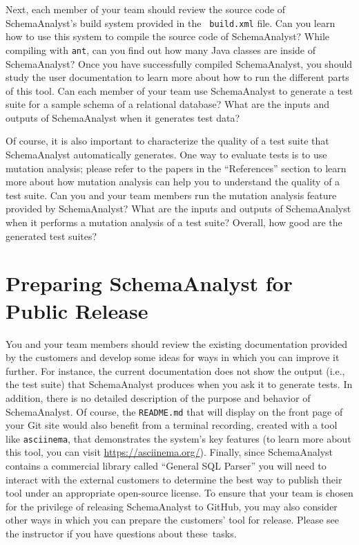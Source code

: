 Next, each member of your team should review the source code of SchemaAnalyst's build system provided in the {\tt
build.xml} file. Can you learn how to use this system to compile the source code of SchemaAnalyst? While compiling with
{\tt ant}, can you find out how many Java classes are inside of SchemaAnalyst? Once you have successfully compiled
SchemaAnalyst, you should study the user documentation to learn more about how to run the different parts of this tool.
Can each member of your team use SchemaAnalyst to generate a test suite for a sample schema of a relational database?
What are the inputs and outputs of SchemaAnalyst when it generates test data?

Of course, it is also important to characterize the quality of a test suite that SchemaAnalyst automatically generates.
One way to evaluate tests is to use mutation analysis; please refer to the papers in the ``References'' section to learn
more about how mutation analysis can help you to understand the quality of a test suite. Can you and your team members
run the mutation analysis feature provided by SchemaAnalyst? What are the inputs and outputs of SchemaAnalyst when it
performs a mutation analysis of a test suite? Overall, how good are the generated test suites?

\vspace*{-.05in}
\section*{Preparing SchemaAnalyst for Public Release}

You and your team members should review the existing documentation provided by the customers and develop some ideas for
ways in which you can improve it further. For instance, the current documentation does not show the output (i.e., the
test suite) that SchemaAnalyst produces when you ask it to generate tests. In addition, there is no detailed description
of the purpose and behavior of SchemaAnalyst. Of course, the {\tt README.md} that will display on the front page of your
Git site would also benefit from a terminal recording, created with a tool like {\tt asciinema}, that demonstrates the
system's key features (to learn more about this tool, you can visit \url{https://asciinema.org/}). Finally, since
SchemaAnalyst contains a commercial library called ``General SQL Parser'' you will need to interact with the external
customers to determine the best way to publish their tool under an appropriate open-source license. To ensure that your
team is chosen for the privilege of releasing SchemaAnalyst to GitHub, you may also consider other ways in
which you can prepare the customers' tool for release. Please see the instructor if you have questions about \mbox{these
tasks}.

